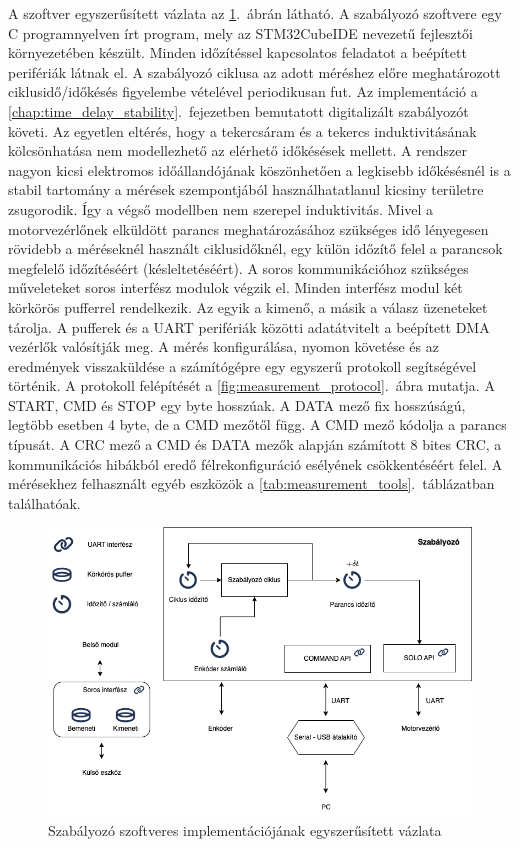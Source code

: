 A szoftver egyszerűsített vázlata az \ref{fig:block_diagram_control_software}.~ábrán látható. 
A szabályozó szoftvere egy C programnyelven írt program, mely az STM32CubeIDE nevezetű 
fejlesztői környezetében készült. 
Minden időzítéssel kapcsolatos feladatot a beépített perifériák látnak el. 
A szabályozó ciklusa az adott méréshez előre meghatározott ciklusidő/időkésés figyelembe 
vételével periodikusan fut. 
Az implementáció a \ref{chap:time_delay_stability}.~fejezetben bemutatott digitalizált szabályozót követi. 
Az egyetlen eltérés, hogy a tekercsáram és a tekercs induktivitásának kölcsönhatása nem modellezhető az elérhető időkésések mellett.  
A rendszer nagyon kicsi elektromos időállandójának köszönhetően a legkisebb időkésésnél is a stabil 
tartomány a mérések szempontjából használhatatlanul kicsiny területre zsugorodik. Így a végső modellben nem szerepel induktivitás. 
Mivel a motorvezérlőnek elküldött parancs meghatározásához szükséges idő lényegesen rövidebb a méréseknél használt ciklusidőknél, 
egy külön időzítő felel a parancsok megfelelő időzítéséért (késleltetéséért). 
A soros kommunikációhoz szükséges műveleteket soros interfész modulok végzik el. 
Minden interfész modul két körkörös pufferrel rendelkezik. 
Az egyik a kimenő, a másik a válasz üzeneteket tárolja. A pufferek és a UART perifériák közötti adatátvitelt a beépített DMA vezérlők valósítják meg. 
A mérés konfigurálása, nyomon követése és az eredmények visszaküldése a számítógépre egy egyszerű protokoll segítségével történik. 
A protokoll felépítését a \ref{fig:measurement_protocol}.~ábra mutatja. 
A START, CMD és STOP egy byte hosszúak. A DATA mező fix hosszúságú, legtöbb esetben 4 byte, de a CMD mezőtől függ.
A CMD mező kódolja a parancs típusát. 
A CRC mező a CMD és DATA mezők alapján számított 8 bites CRC, a kommunikációs 
hibákból eredő félrekonfiguráció esélyének csökkentéséért felel. 
A mérésekhez felhasznált egyéb eszközök a \ref{tab:measurement_tools}.~táblázatban találhatóak.

\begin{figure}[t]
	\begin{center}
		\includegraphics[width=14cm]{images/impedance_controler_software_diagram.png}
		\caption{Szabályozó szoftveres implementációjának egyszerűsített vázlata}\label{fig:block_diagram_control_software}
	\end{center}
\end{figure}



